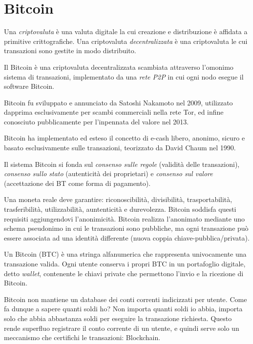 \chapter{Bitcoin}
\label{chp:bitcoin}

Una \textit{criptovaluta} è una valuta digitale la cui creazione e distribuzione è affidata a primitive crittografiche. Una criptovaluta \textit{decentralizzata} è una criptovaluta le cui transazioni sono gestite in modo distribuito.

Il Bitcoin è una criptovaluta decentralizzata scambiata attraverso l'omonimo sistema di transazioni, implementato da una \textit{rete P2P} in cui ogni nodo esegue il software Bitcoin.

Bitcoin fu sviluppato e annunciato da Satoshi Nakamoto nel 2009, utilizzato dapprima esclusivamente per scambi commerciali nella rete Tor, ed infine conosciuto pubblicamente per l'inpennata del valore nel 2013.

Bitcoin ha implementato ed esteso il concetto di e-cash libero, anonimo, sicuro e basato esclusivamente sulle transazioni, teorizzato da David Chaum nel 1990.



Il sistema Bitcoin si fonda sul \textit{consenso sulle regole} (validità delle transazioni), \textit{consenso sullo stato} (autenticità dei proprietari) e \textit{consenso sul valore} (accettazione dei BT come forma di pagamento).

Una moneta reale deve garantire: riconoscibilità, divisibilità, trasportabilità, trasferibilità, utilizzabilità, auntenticità e durevolezza.
Bitcoin soddisfa questi requisiti aggiungendovi l'anonimicità. Bitcoin realizza l'anonimato mediante uno schema pseudonimo in cui le transazioni sono pubbliche, ma ogni transazione può essere associata ad una identità differente (nuova coppia chiave-pubblica/privata).

Un Bitcoin (BTC) è una stringa alfanumerica che rappresenta univocamente una transazione valida.
Ogni utente conserva i propri BTC in un portafoglio digitale, detto \textit{wallet}, contenente le chiavi private che permettono l'invio e la ricezione di Bitcoin.

Bitcoin non mantiene un database dei conti correnti indicizzati per utente. Come fa dunque a sapere quanti soldi ho? Non importa quanti soldi io abbia, importa solo che abbia abbastanza soldi per eseguire la transazione richiesta.
Questo rende superfluo registrare il conto corrente di un utente, e quindi serve solo un meccanismo che certifichi le transazioni: Blockchain.


